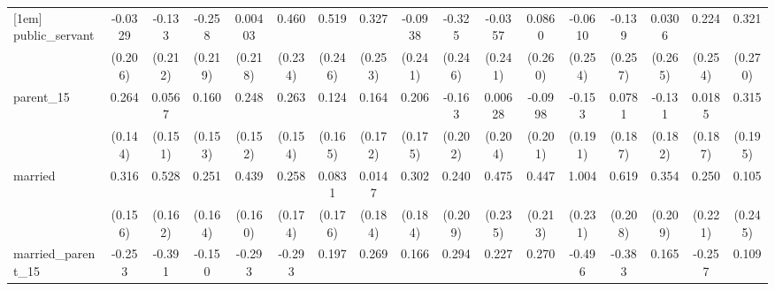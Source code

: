 {\begin{tabular}{l*{16}{c}}
[1em]
public\_servant      &     -0.0329         &      -0.133         &      -0.258         &     0.00403         &       0.460\sym{*}  &       0.519\sym{*}  &       0.327         &     -0.0938         &      -0.325         &     -0.0357         &      0.0860         &     -0.0610         &      -0.139         &      0.0306         &       0.224         &       0.321         \\
                    &     (0.206)         &     (0.212)         &     (0.219)         &     (0.218)         &     (0.234)         &     (0.246)         &     (0.253)         &     (0.241)         &     (0.246)         &     (0.241)         &     (0.260)         &     (0.254)         &     (0.257)         &     (0.265)         &     (0.254)         &     (0.270)         \\
[1em]
parent\_15           &       0.264         &      0.0567         &       0.160         &       0.248         &       0.263         &       0.124         &       0.164         &       0.206         &      -0.163         &     0.00628         &     -0.0998         &      -0.153         &      0.0781         &      -0.131         &      0.0185         &       0.315         \\
                    &     (0.144)         &     (0.151)         &     (0.153)         &     (0.152)         &     (0.154)         &     (0.165)         &     (0.172)         &     (0.175)         &     (0.202)         &     (0.204)         &     (0.201)         &     (0.191)         &     (0.187)         &     (0.182)         &     (0.187)         &     (0.195)         \\
[1em]
married             &       0.316\sym{*}  &       0.528\sym{**} &       0.251         &       0.439\sym{**} &       0.258         &      0.0831         &      0.0147         &       0.302         &       0.240         &       0.475\sym{*}  &       0.447\sym{*}  &       1.004\sym{***}&       0.619\sym{**} &       0.354         &       0.250         &       0.105         \\
                    &     (0.156)         &     (0.162)         &     (0.164)         &     (0.160)         &     (0.174)         &     (0.176)         &     (0.184)         &     (0.184)         &     (0.209)         &     (0.235)         &     (0.213)         &     (0.231)         &     (0.208)         &     (0.209)         &     (0.221)         &     (0.245)         \\
[1em]
married\_parent\_15   &      -0.253         &      -0.391         &      -0.150         &      -0.293         &      -0.293         &       0.197         &       0.269         &       0.166         &       0.294         &       0.227         &       0.270         &      -0.496         &      -0.383         &       0.165         &      -0.257         &       0.109         \\

\end{tabular}}
